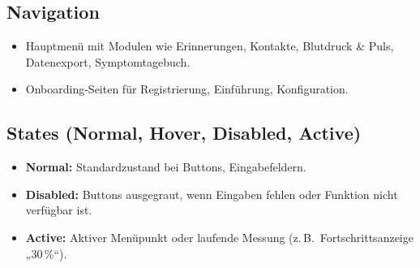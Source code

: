 \subsection{Navigation}
\begin{itemize}
	\item Hauptmenü mit Modulen wie Erinnerungen, Kontakte, Blutdruck \& Puls, Datenexport, Symptomtagebuch.
	\item Onboarding-Seiten für Registrierung, Einführung, Konfiguration.
\end{itemize}

\subsection{States (Normal, Hover, Disabled, Active)}
\begin{itemize}
	\item \textbf{Normal:} Standardzustand bei Buttons, Eingabefeldern.
	\item \textbf{Disabled:} Buttons ausgegraut, wenn Eingaben fehlen oder Funktion nicht verfügbar ist.
	\item \textbf{Active:} Aktiver Menüpunkt oder laufende Messung (z.\,B.\ Fortschrittsanzeige „30\,\%“).
\end{itemize}

\newpage
